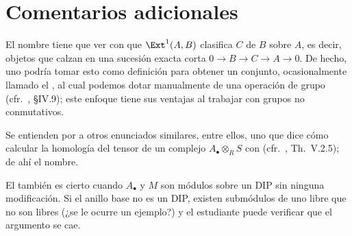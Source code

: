 \documentclass[11pt, reqno]{amsart}
\begin{document}
\section*{Comentarios adicionales}
El nombre  tiene que ver con que $\Ext^1(A, B)$ clasifica  $C$ de $B$ sobre $A$, es decir, objetos que
calzan en una sucesión exacta corta $0 \to B \to C \to A \to 0$.
De hecho, uno podría tomar esto como definición para obtener un conjunto, ocasionalmente llamado el , al
cual podemos dotar manualmente de una operación de grupo (cfr.\ \cite{hilton:homological}, \S IV.9); este enfoque tiene sus ventajas al
trabajar con grupos no conmutativos.

Se entienden por  a otros enunciados similares, entre ellos, uno que dice cómo calcular la
homología del tensor de un complejo $A_\bullet \otimes_R S$ con  (cfr.\ \cite{hilton:homological}, Th.~V.2.5);
de ahí el nombre.

El  también es cierto cuando $A_\bullet$ y $M$ son módulos sobre un DIP
sin ninguna modificación.
Si el anillo base no es un DIP, existen submódulos de uno libre que no son libres (¿se le ocurre un ejemplo?) y el estudiante puede
verificar que el argumento se cae.

\printbibliography
\end{document}
